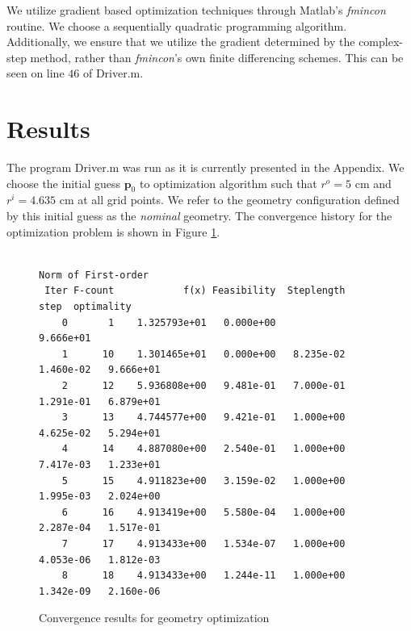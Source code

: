 \documentclass[11pt]{article}
\newcommand{\bs}[1] {\boldsymbol{#1}}
\begin{document}
We utilize gradient based optimization techniques through
Matlab's \emph{fmincon} routine. We choose a
sequentially quadratic programming algorithm.
Additionally, we ensure that we utilize the gradient
determined by the complex-step method, rather than
\emph{fmincon}'s own finite differencing schemes.
This can be seen on line $46$ of Driver.m.

\section{Results}

The program Driver.m was run as it is currently presented
in the Appendix. We choose the initial guess $\bs{p}_0$ to
optimization algorithm such that $r^o = 5$ cm and $r^i = 4.635$ cm
at all grid points. We refer to the geometry configuration defined
by this initial guess as the \emph{nominal} geometry.
The convergence history for the optimization
problem is shown in Figure \ref{fig:convergence}.

\begin{figure}[hbt]
\small
\centering
\begin{verbatim}
                                                          Norm of First-order
 Iter F-count            f(x) Feasibility  Steplength        step  optimality
    0       1    1.325793e+01   0.000e+00                           9.666e+01
    1      10    1.301465e+01   0.000e+00   8.235e-02   1.460e-02   9.666e+01
    2      12    5.936808e+00   9.481e-01   7.000e-01   1.291e-01   6.879e+01
    3      13    4.744577e+00   9.421e-01   1.000e+00   4.625e-02   5.294e+01
    4      14    4.887080e+00   2.540e-01   1.000e+00   7.417e-03   1.233e+01
    5      15    4.911823e+00   3.159e-02   1.000e+00   1.995e-03   2.024e+00
    6      16    4.913419e+00   5.580e-04   1.000e+00   2.287e-04   1.517e-01
    7      17    4.913433e+00   1.534e-07   1.000e+00   4.053e-06   1.812e-03
    8      18    4.913433e+00   1.244e-11   1.000e+00   1.342e-09   2.160e-06
\end{verbatim}
\caption{Convergence results for geometry optimization}
\label{fig:convergence}
\end{figure}
\end{document}
